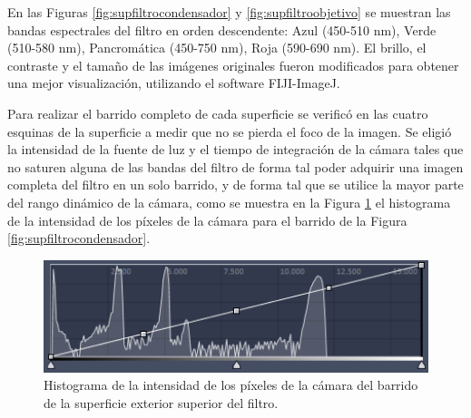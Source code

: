 En las Figuras \ref{fig:supfiltrocondensador} y \ref{fig:supfiltroobjetivo} se muestran las bandas espectrales del filtro en orden descendente: Azul (450-510 nm), Verde (510-580 nm), Pancromática (450-750 nm), Roja (590-690 nm). El brillo, el contraste y el tamaño de las imágenes originales fueron modificados para obtener una mejor visualización, utilizando el software FIJI-ImageJ. 

\vspace{1.0cm}
\vspace{1.0cm}

Para realizar el barrido completo de cada superficie se verificó en las cuatro esquinas de la superficie a medir que no se pierda el foco de la imagen. Se eligió la intensidad de la fuente de luz y el tiempo de integración de la cámara tales que no saturen alguna de las bandas del filtro de forma tal poder adquirir una imagen completa del filtro en un solo barrido, y de forma tal que se utilice la mayor parte del rango dinámico de la cámara, como se muestra en la Figura \ref{fig:histograma15x15} el histograma de la intensidad de los píxeles de la cámara para el barrido de la Figura \ref{fig:supfiltrocondensador}.

\begin{figure}[!h]
	\centering
	\includegraphics[width=1.0\textwidth]{Figs/defectosZEISS/histograma15x15.png}
	\caption{Histograma de la intensidad de los píxeles de la cámara del barrido de la superficie exterior superior del filtro.}
	\label{fig:histograma15x15}
\end{figure}
 
\vspace{1.0cm}
\vspace{1.0cm}

